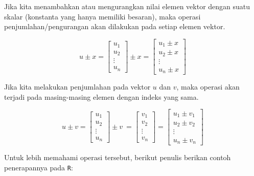 \documentclass[
]{book}
\theoremstyle{definition}
\theoremstyle{definition}
\theoremstyle{definition}
\theoremstyle{definition}
\theoremstyle{remark}
\begin{document}
Jika kita menambahkan atau mengurangkan nilai elemen vektor dengan suatu skalar (konstanta yang hanya memiliki besaran), maka operasi penjumlahan/pengurangan akan dilakukan pada setiap elemen vektor.

\begin{equation}
u \pm x = \begin{bmatrix}
      u_1            \\[0.3em]
      u_2            \\[0.3em]
      \vdots         \\[0.3em] 
      u_n
     \end{bmatrix}
\pm x = \begin{bmatrix}
      u_1 \pm x            \\[0.3em]
      u_2 \pm x           \\[0.3em]
      \vdots         \\[0.3em] 
      u_n \pm x
     \end{bmatrix}
     \label{eq:addvector}
\end{equation}

Jika kita melakukan penjumlahan pada vektor \(u\) dan \(v\), maka operasi akan terjadi pada masing-masing elemen dengan indeks yang sama.

\begin{equation}
u \pm v = \begin{bmatrix}
      u_1            \\[0.3em]
      u_2            \\[0.3em]
      \vdots         \\[0.3em] 
      u_n
     \end{bmatrix}
\pm v\ = \begin{bmatrix}
      v_1            \\[0.3em]
      v_2            \\[0.3em]
      \vdots         \\[0.3em] 
      v_n
     \end{bmatrix}
= \begin{bmatrix}
      u_1 \pm v_1            \\[0.3em]
      u_2 \pm v_2           \\[0.3em]
      \vdots         \\[0.3em] 
      u_n \pm v_n
     \end{bmatrix}
     \label{eq:addvector2}
\end{equation}

Untuk lebih memahami operasi tersebut, berikut penulis berikan contoh penerapannya pada \texttt{R}:
\end{document}
